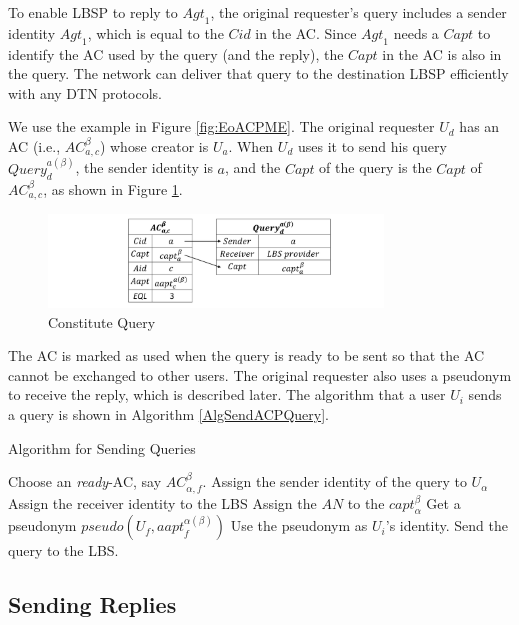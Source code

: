 \documentclass[conference]{IEEEtran}
\begin{document}
To enable LBSP to reply to ${Agt}_1$, the original requester's query includes a sender identity ${Agt}_1$, which is equal to the $Cid$ in the AC. Since ${Agt}_1$ needs a ${Capt}$ to identify the AC used by the query (and the reply), the ${Capt}$ in the AC is also in the query. The network can deliver that query to the destination LBSP efficiently with any DTN protocols.

We use the example in Figure \ref{fig:EoACPME}. The original requester $U_d$ has an AC (i.e., ${AC}^{\beta }_{a,c}$) whose creator is $U_a$. When $U_d$ uses it to send his query ${Query}^{a\left(\beta\right)}_d$, the sender identity is $a$, and the $Capt$ of the query is the $Capt$ of ${AC}^{\beta }_{a,c}$, as shown in Figure \ref{fig:ConstituteQuery}.

\begin{figure} [H]
  \centering 
  \includegraphics[width=3.5in]{figures/FIG_4_5_Constitute_Query.png}
  \caption{Constitute Query} 
  \label{fig:ConstituteQuery} %
\end{figure}

The AC is marked as used when the query is ready to be sent so that the AC cannot be exchanged to other users. The original requester also uses a pseudonym to receive the reply, which is described later. The algorithm that a user $U_i$ sends a query is shown in Algorithm \ref{AlgSendACPQuery}.


\begin{algorithm} [hbtp]
\caption{Algorithm for Sending Queries}\label{AlgSendACPQuery}
\begin{algorithmic}[1]
 {}
\State Choose an \textit{ready}-AC, say ${AC}_{\alpha,f}^{\beta}$.
\State Assign the sender identity of the query to $U_{\alpha}$
\State Assign the receiver identity to the LBS
\State Assign the $AN$ to the ${capt}_{\alpha}^{\beta}$
\State Get a pseudonym $pseudo\left(U_f,{aapt}_f^{\alpha \left(\beta \right)}\right)$
\State Use the pseudonym as $U_i$’s identity.
\State Send the query to the LBS.
\EndProcedure
\end{algorithmic}
\end{algorithm}

\subsection{ Sending Replies}
\end{document}
